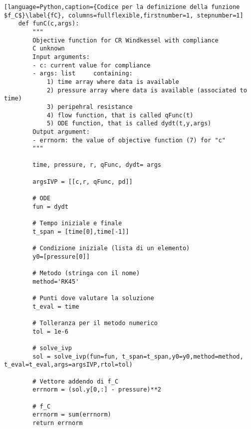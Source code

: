 \begin{lstlisting}[language=Python,caption={Codice per la definizione della funzione $f_C$}\label{fC}, columns=fullflexible,firstnumber=1, stepnumber=1]
    def funC(c,args):
        """
        Objective function for CR Windkessel with compliance
        C unknown
        Input arguments:
        - c: current value for compliance
        - args: list     containing:
            1) time array where data is available
            2) pressure array where data is available (associated to time)
            3) peripehral resistance
            4) flow function, that is called qFunc(t)
            5) ODE function, that is called dydt(t,y,args)
        Output argument:
        - errnorm: the value of objective function (7) for "c"
        """
    
        time, pressure, r, qFunc, dydt= args
    
        argsIVP = [[c,r, qFunc, pd]]
    
        # ODE
        fun = dydt
    
        # Tempo iniziale e finale
        t_span = [time[0],time[-1]]
    
        # Condizione iniziale (lista di un elemento)
        y0=[pressure[0]]
    
        # Metodo (stringa con il nome)
        method='RK45'
   
        # Punti dove valutare la soluzione
        t_eval = time

        # Tolleranza per il metodo numerico
        tol = 1e-6
    
        # solve_ivp
        sol = solve_ivp(fun=fun, t_span=t_span,y0=y0,method=method, t_eval=t_eval,args=argsIVP,rtol=tol)
    
        # Vettore addendo di f_C
        errnorm = (sol.y[0,:] - pressure)**2
    
        # f_C
        errnorm = sum(errnorm)
        return errnorm
\end{lstlisting}
